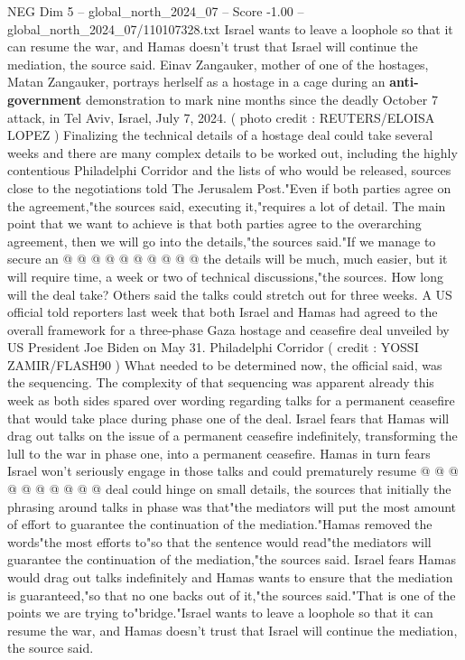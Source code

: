 \begin{textsample}{NEG Dim 5 – global\_north\_2024\_07 – Score -1.00 – global\_north\_2024\_07/110107328.txt}  \label{ex:f5_neg_145}
Israel wants to leave a loophole so that it can resume the war, and Hamas doesn't trust that Israel will continue the mediation, the source said.
Einav Zangauker, mother of one of the hostages, Matan Zangauker, portrays herlself as a hostage in a cage during an \textbf{anti-government} demonstration to mark nine months since the deadly October 7 attack, in Tel Aviv, Israel, July 7, 2024. ( photo credit : REUTERS/ELOISA LOPEZ ) Finalizing the technical details of a hostage deal could take several weeks and there are many complex details to be worked out, including the highly contentious Philadelphi Corridor and the lists of who would be released, sources close to the negotiations told The Jerusalem Post."Even if both parties agree on the agreement,"the sources said, executing it,"requires a lot of detail.
The main point that we want to achieve is that both parties agree to the overarching agreement, then we will go into the details,"the sources said."If we manage to secure an @ @ @ @ @ @ @ @ @ @ the details will be much, much easier, but it will require time, a week or two of technical discussions,"the sources.
How long will the deal take?
Others said the talks could stretch out for three weeks.
A US official told reporters last week that both Israel and Hamas had agreed to the overall framework for a three-phase Gaza hostage and ceasefire deal unveiled by US President Joe Biden on May 31.
Philadelphi Corridor ( credit : YOSSI ZAMIR/FLASH90 ) What needed to be determined now, the official said, was the sequencing.
The complexity of that sequencing was apparent already this week as both sides spared over wording regarding talks for a permanent ceasefire that would take place during phase one of the deal.
Israel fears that Hamas will drag out talks on the issue of a permanent ceasefire indefinitely, transforming the lull to the war in phase one, into a permanent ceasefire.
Hamas in turn fears Israel won't seriously engage in those talks and could prematurely resume @ @ @ @ @ @ @ @ @ @ deal could hinge on small details, the sources that initially the phrasing around talks in phase was that"the mediators will put the most amount of effort to guarantee the continuation of the mediation."Hamas removed the words"the most efforts to"so that the sentence would read"the mediators will guarantee the continuation of the mediation,"the sources said.
Israel fears Hamas would drag out talks indefinitely and Hamas wants to ensure that the mediation is guaranteed,"so that no one backs out of it,"the sources said."That is one of the points we are trying to"bridge."Israel wants to leave a loophole so that it can resume the war, and Hamas doesn't trust that Israel will continue the mediation, the source said.

\end{textsample}
